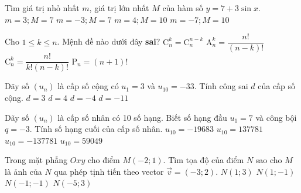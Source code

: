 \begin{ex}%
Tìm giá trị nhỏ nhất $m$, giá trị lớn nhất $M$ của hàm số $y=7+3\sin x$.
\choice
{$m=3;M=7$}
{$m=-3;M=7$}
{\True $m=4;M=10$}
{$m=-7;M=10$}
\end{ex}
\begin{ex}%
Cho $1\le k\le n$. Mệnh đề nào dưới đây \textbf{sai}?
\choice
{$\mathrm{C}_{n}^{k}=\mathrm{C}_{n}^{n-k}$}
{$\mathrm{A}_{n}^{k}=\dfrac{n!}{(n-k)!}$}
{$\mathrm{C}_{n}^{k}=\dfrac{n!}{k!\left(n-k\right)!}$}
{\True $\mathrm{P}_n=(n+1)!$}
\end{ex}
\begin{ex}%
Dãy số $\left(u_n\right)$ là cấp số cộng có $u_1=3$ và $u_{10}=-33$. Tính công sai $d$ của cấp số cộng.
\choice
{$d=3$}
{$d=4$}
{\True $d=-4$}
{$d=-11$}
\end{ex}
\begin{ex}%
Dãy số $\left(u_n\right)$ là cấp số nhân có 10 số hạng. Biết số hạng đầu $u_1=7$ và công bội $q=-3$. Tính số hạng cuối của cấp số nhân.
\choice
{$u_{10}=-19683$}
{$u_{10}=137781$}
{\True $u_{10}=-137781$}
{$u_{10}=59049$}
\end{ex}
\begin{ex}%
Trong mặt phẳng $Oxy$ cho điểm $M(-2;1)$. Tìm tọa độ của điểm $N$ sao cho $M$ là ảnh của $N$ qua phép tịnh tiến theo vector $\vec{v}=(-3;2)$.
\choice
{$N(1;3)$}
{\True $N(1;-1)$}
{$N(-1;-1)$}
{$N(-5;3)$}
\end{ex}
